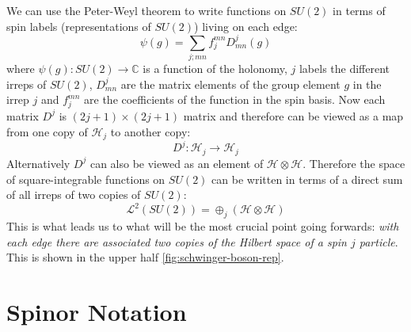 \documentclass[twocolumn,draft,aps,nofootinbib,nobibnotes,final]{revtex4-2}
\newcommand{\C}{\mathbb{C}}
\newcommand{\mc}[1]{\mathcal{#1}}
\begin{document}
We can use the Peter-Weyl theorem to write functions on $ SU(2) $ in terms of spin labels (representations of $ SU(2) $) living on each edge:
\begin{equation}\label{eqn:peter-weyl}
	\psi(g) = \sum_{j;mn} f^{mn}_j D^j_{mn}(g)
\end{equation}
where $ \psi(g):SU(2) \rightarrow \C $ is a function of the holonomy, $ j $ labels the different irreps of $ SU(2) $, $ D^j_{mn} $ are the matrix elements of the group element $ g $ in the irrep $ j $ and $ f^{mn}_j $ are the coefficients of the function in the spin basis. Now each matrix $ D^j $ is $ (2j+1) \times (2j+1) $ matrix and therefore can be viewed as a map from one copy of $ \mc{H}_j $ to another copy:
\begin{equation}\label{eqn:irrep-map}
	D^j : \mc{H}_j \rightarrow \mc{H}_j
\end{equation}
Alternatively $ D^j $ can also be viewed as an element of $ \mc{H} \otimes \mc{H} $. Therefore the space of square-integrable functions on $ SU(2) $ can be written in terms of a direct sum of all irreps of two copies of $ SU(2) $:
\begin{equation}\label{eqn:edge-hilbert-space}
	\mc{L}^2(SU(2)) = \oplus_j (\mc{H} \otimes \mc{H})
\end{equation}
This is what leads us to what will be the most crucial point going forwards: \textit{with each edge there are associated two copies of the Hilbert space of a spin $ j $ particle}. This is shown in the upper half \autoref{fig:schwinger-boson-rep}.

\section{Spinor Notation}\label{sec:spinor-notation}
\end{document}
